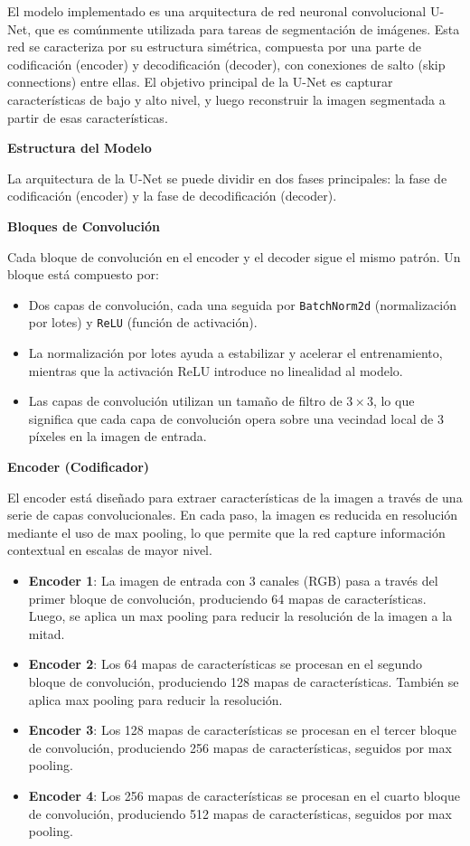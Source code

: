 El modelo implementado es una arquitectura de red neuronal convolucional U-Net, que es comúnmente utilizada para tareas de segmentación de imágenes. Esta red se caracteriza por su estructura simétrica, compuesta por una parte de codificación (encoder) y decodificación (decoder), con conexiones de salto (skip connections) entre ellas. El objetivo principal de la U-Net es capturar características de bajo y alto nivel, y luego reconstruir la imagen segmentada a partir de esas características.

\textbf{Estructura del Modelo}

La arquitectura de la U-Net se puede dividir en dos fases principales: la fase de codificación (encoder) y la fase de decodificación (decoder).

\textbf{Bloques de Convolución}

Cada bloque de convolución en el encoder y el decoder sigue el mismo patrón. Un bloque está compuesto por:
\begin{itemize}
    \item Dos capas de convolución, cada una seguida por \texttt{BatchNorm2d} (normalización por lotes) y \texttt{ReLU} (función de activación).
    \item La normalización por lotes ayuda a estabilizar y acelerar el entrenamiento, mientras que la activación ReLU introduce no linealidad al modelo.
    \item Las capas de convolución utilizan un tamaño de filtro de $3 \times 3$, lo que significa que cada capa de convolución opera sobre una vecindad local de 3 píxeles en la imagen de entrada.
\end{itemize}

\textbf{Encoder (Codificador)}

El encoder está diseñado para extraer características de la imagen a través de una serie de capas convolucionales. En cada paso, la imagen es reducida en resolución mediante el uso de max pooling, lo que permite que la red capture información contextual en escalas de mayor nivel.

\begin{itemize}
    \item \textbf{Encoder 1}: La imagen de entrada con 3 canales (RGB) pasa a través del primer bloque de convolución, produciendo 64 mapas de características. Luego, se aplica un max pooling para reducir la resolución de la imagen a la mitad.
    \item \textbf{Encoder 2}: Los 64 mapas de características se procesan en el segundo bloque de convolución, produciendo 128 mapas de características. También se aplica max pooling para reducir la resolución.
    \item \textbf{Encoder 3}: Los 128 mapas de características se procesan en el tercer bloque de convolución, produciendo 256 mapas de características, seguidos por max pooling.
    \item \textbf{Encoder 4}: Los 256 mapas de características se procesan en el cuarto bloque de convolución, produciendo 512 mapas de características, seguidos por max pooling.
\end{itemize}

